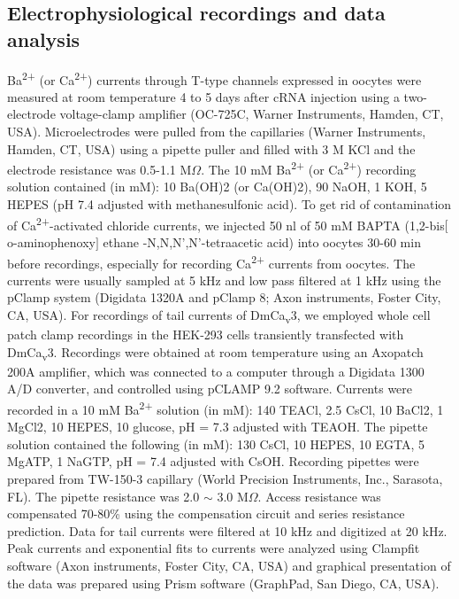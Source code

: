 \subsection*{Electrophysiological recordings and data analysis}

Ba\textsuperscript{2+} (or Ca\textsuperscript{2+}) currents through T-type channels expressed in oocytes were measured at room temperature 4 to 5 days after cRNA injection using a two-electrode voltage-clamp amplifier (OC-725C, Warner Instruments, Hamden, CT, USA).
Microelectrodes were pulled from the capillaries (Warner Instruments, Hamden, CT, USA) using a pipette puller and filled with 3 M KCl and the electrode resistance was 0.5-1.1 M$\Omega$.
The 10 mM Ba\textsuperscript{2+} (or Ca\textsuperscript{2+}) recording solution contained (in mM): 10 Ba(OH)2 (or Ca(OH)2), 90 NaOH, 1 KOH, 5 HEPES (pH 7.4 adjusted with methanesulfonic acid).
To get rid of contamination of Ca\textsuperscript{2+}-activated chloride currents, we injected 50 nl of 50 mM BAPTA (1,2-bis$[$o-aminophenoxy$]$ ethane -N,N,N\textquoteright,N\textquoteright-tetraacetic acid) into oocytes 30-60 min before recordings, especially for recording Ca\textsuperscript{2+} currents from oocytes.
The currents were usually sampled at 5 kHz and low pass filtered at 1 kHz using the pClamp system (Digidata 1320A and pClamp 8; Axon instruments, Foster City, CA, USA). 
For recordings of tail currents of DmCa\textsubscript{v}3, we employed whole cell patch clamp recordings in the HEK-293 cells transiently transfected with DmCa\textsubscript{v}3. 
Recordings were obtained at room temperature using an Axopatch 200A amplifier, which was connected to a computer through a Digidata 1300 A/D converter, and controlled using pCLAMP 9.2 software. 
Currents were recorded in a 10 mM Ba\textsuperscript{2+} solution (in mM): 140 TEACl, 2.5 CsCl, 10 BaCl2, 1 MgCl2, 10 HEPES, 10 glucose, pH = 7.3 adjusted with TEAOH. The pipette solution contained the following (in mM): 130 CsCl, 10 HEPES, 10 EGTA, 5 MgATP, 1 NaGTP, pH = 7.4 adjusted with CsOH. 
Recording pipettes were prepared from TW-150-3 capillary (World Precision Instruments, Inc., Sarasota, FL).
 The pipette resistance was 2.0 $\sim$ 3.0 M$\Omega$. Access resistance was compensated 70-80\%{} using the compensation circuit and series resistance prediction. 
Data for tail currents were filtered at 10 kHz and digitized at 20 kHz. 
Peak currents and exponential fits to currents were analyzed using Clampfit software (Axon instruments, Foster City, CA, USA) and graphical presentation of the data was prepared using Prism software (GraphPad, San Diego, CA, USA). 
